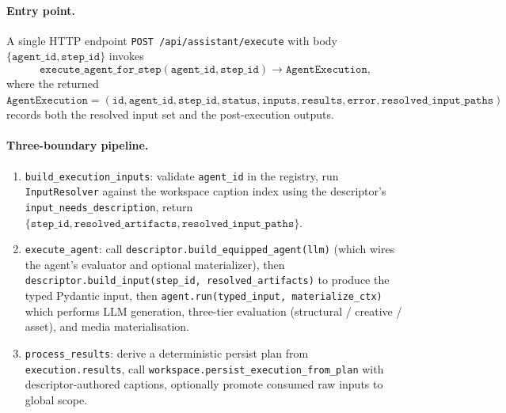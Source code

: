 \paragraph{Entry point.}
A single HTTP endpoint
\texttt{POST /api/assistant/execute} with body
$\{\texttt{agent\_id},\texttt{step\_id}\}$ invokes
\begin{equation*}
\texttt{execute\_agent\_for\_step}(\texttt{agent\_id},\texttt{step\_id})\!\to\!\texttt{AgentExecution},
\end{equation*}
where the returned
$\texttt{AgentExecution}=(\texttt{id},\texttt{agent\_id},\texttt{step\_id},\texttt{status},\texttt{inputs},\texttt{results},\texttt{error},\texttt{resolved\_input\_paths})$
records both the resolved input set and the post-execution outputs.

\paragraph{Three-boundary pipeline.}
\begin{enumerate}
\item \texttt{build\_execution\_inputs}: validate \texttt{agent\_id} in
the registry, run \texttt{InputResolver} against the workspace caption
index using the descriptor's \texttt{input\_needs\_description}, return
$\{\texttt{step\_id},\texttt{resolved\_artifacts},\texttt{resolved\_input\_paths}\}$.
\item \texttt{execute\_agent}: call
\texttt{descriptor.build\_equipped\_agent(llm)} (which wires the
agent's evaluator and optional materializer), then
\texttt{descriptor.build\_input(step\_id, resolved\_artifacts)} to
produce the typed Pydantic input, then \texttt{agent.run(typed\_input,
materialize\_ctx)} which performs LLM generation, three-tier evaluation
(structural / creative / asset), and media materialisation.
\item \texttt{process\_results}: derive a deterministic persist plan
from \texttt{execution.results}, call
\texttt{workspace.persist\_execution\_from\_plan} with descriptor-authored
captions, optionally promote consumed raw inputs to global scope.
\end{enumerate}

